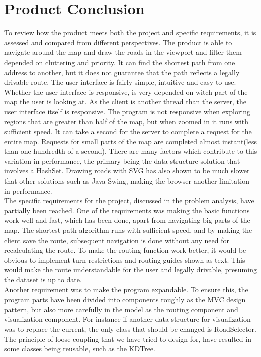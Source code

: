 \documentclass[a4paper,10pt,titlepage]{article}
\begin{document}
	\section{Product Conclusion}
	To review how the product meets both the project and specific requirements, it is assessed and compared from different perspectives. The product is able to navigate around the map and draw the roads in the viewport and filter them depended on cluttering and priority. It can find the shortest path from one address to another, but it does not guarantee that the path reflects a legally drivable route. The user interface is fairly simple, intuitive and easy to use. Whether the user interface is responsive, is very depended on witch part of the map the user is looking at. As the client is another thread than the server, the user interface itself is responsive. The program is not responsive when exploring regions that are greater than half of the map, but when zoomed in it runs with sufficient speed. It can take a second for the server to complete a request for the entire map. Requests for small parts of the map are completed almost instant(less than one hundredth of a second). There are many factors which contribute to this variation in performance, the primary being the data structure solution that involves a HashSet. Drawing roads with SVG has also shown to be much slower that other solutions such as Java Swing, making the browser another limitation in performance.\\
The specific requirements for the project, discussed in the problem analysis, have partially been reached. One of the requirements was making the basic functions work well and fast, which has been done, apart from navigating big parts of the map. The shortest path algorithm runs with sufficient speed, and by making the client save the route, subsequent navigation is done without any need for recalculating the route. To make the routing function work better, it would be obvious to implement turn restrictions and routing guides shown as text. This would make the route understandable for the user and legally drivable, presuming the dataset is up to date.\\
Another requirement was to make the program expandable. To ensure this, the program parts have been divided into components roughly as the MVC design pattern, but also more carefully in the model as the routing component and visualization component. For instance if another data structure for visualization was to replace the current, the only class that should be changed is RoadSelector. The principle of loose coupling that we have tried to design for, have resulted in some classes being reusable, such as the KDTree.\\
\end{document}

